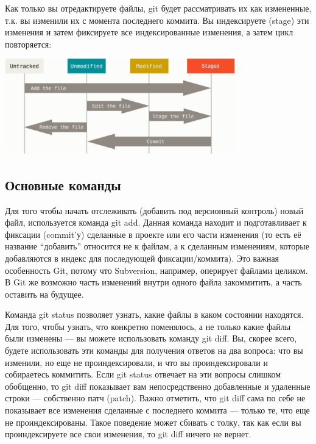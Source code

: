 \documentclass[a5paper]{article}
\begin{document}
Как только вы отредактируете файлы, git будет рассматривать их как измененные, т.к. вы изменили их с момента последнего коммита. Вы индексируете (stage) эти изменения и затем фиксируете все индексированные изменения, а затем цикл повторяется:

\begin{center}
	\includegraphics[width=0.75\textwidth]{fileLifeCycle.png}
\end{center}

\subsection{Основные команды}

Для того чтобы начать отслеживать (добавить под версионный контроль) новый файл, используется команда git add. Данная команда находит и подготавливает к фиксации (commit’у) сделанные в проекте или его части изменения (то есть её название ``добавить'' относится не к файлам, а к сделанным изменениям, которые добавляются в индекс для последующей фиксации/коммита). Это важная особенность Git, потому что Subversion, например, оперирует файлами целиком. В Git же возможно часть изменений внутри одного файла закоммитить, а часть оставить на будущее.

Команда git status позволяет узнать, какие файлы в каком состоянии находятся. Для того, чтобы узнать, что конкретно поменялось, а не только какие файлы были изменены --- вы можете использовать команду git diff. Вы, скорее всего, будете использовать эти команды для получения ответов на два вопроса: что вы изменили, но еще не проиндексировали, и что вы проиндексировали и собираетесь коммитить. Если git status отвечает на эти вопросы слишком обобщенно, то git diff показывает вам непосредственно добавленные и удаленные строки --- собственно патч (patch). Важно отметить, что git diff сама по себе не показывает все изменения сделанные с последнего коммита --- только те, что еще не проиндексированы. Такое поведение может сбивать с толку, так как если вы проиндексируете все свои изменения, то git diff ничего не вернет.
\end{document}
